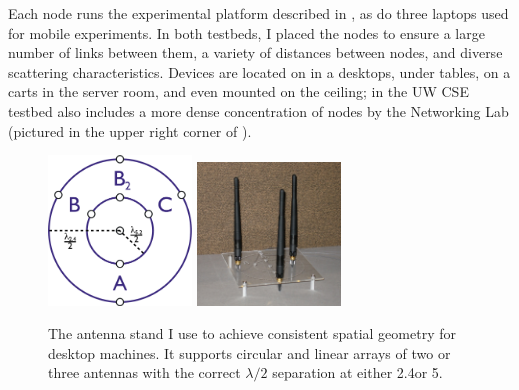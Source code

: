 Each node runs the experimental platform described in , as do three laptops used for mobile experiments. In both testbeds, I placed the nodes to ensure a large number of links between them, a variety of distances between nodes, and diverse scattering characteristics. Devices are located on in a desktops, under tables, on a carts in the server room, and even mounted on the ceiling; in the UW CSE testbed also includes a more dense concentration of nodes by the Networking Lab (pictured in the upper right corner of ).

\begin{figure}[ht]
	\centering
	\includegraphics[width=1.5in]{figures/rpsma_dual_632_single_lines.pdf}%
	\hspace{1in}
	\includegraphics[height=1.5in,width=1.5in]{figures/antennas.jpg}
	\caption[A custom antenna stand used to achieve consistent spatial geometry]{\label{fig:antenna_stand}The antenna stand I use to achieve consistent spatial geometry for desktop machines. It supports circular and linear arrays of two or three antennas with the correct $\lambda/2$ separation at either 2.4\GHz or 5\GHz.}
\end{figure}
